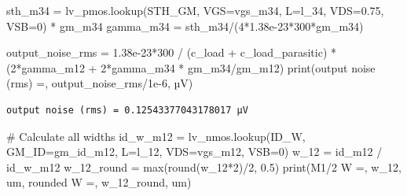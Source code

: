 \documentclass[
  a4paper,
  DIV=11,
  numbers=noendperiod]{scrartcl}
\newenvironment{Shaded}{\begin{snugshade}}{\end{snugshade}}
\newcommand{\BuiltInTok}[1]{\textcolor[rgb]{0.00,0.23,0.31}{#1}}
\newcommand{\CommentTok}[1]{\textcolor[rgb]{0.37,0.37,0.37}{#1}}
\newcommand{\DecValTok}[1]{\textcolor[rgb]{0.68,0.00,0.00}{#1}}
\newcommand{\FloatTok}[1]{\textcolor[rgb]{0.68,0.00,0.00}{#1}}
\newcommand{\NormalTok}[1]{\textcolor[rgb]{0.00,0.23,0.31}{#1}}
\newcommand{\OperatorTok}[1]{\textcolor[rgb]{0.37,0.37,0.37}{#1}}
\newcommand{\StringTok}[1]{\textcolor[rgb]{0.13,0.47,0.30}{#1}}
\begin{document}
\begin{tcolorbox}
\begin{Shaded}
\begin{Highlighting}[]
\NormalTok{sth\_m34 }\OperatorTok{=}\NormalTok{ lv\_pmos.lookup(}\StringTok{\textquotesingle{}STH\_GM\textquotesingle{}}\NormalTok{, VGS}\OperatorTok{=}\NormalTok{vgs\_m34, L}\OperatorTok{=}\NormalTok{l\_34, VDS}\OperatorTok{=}\FloatTok{0.75}\NormalTok{, VSB}\OperatorTok{=}\DecValTok{0}\NormalTok{) }\OperatorTok{*}\NormalTok{ gm\_m34}
\NormalTok{gamma\_m34 }\OperatorTok{=}\NormalTok{ sth\_m34}\OperatorTok{/}\NormalTok{(}\DecValTok{4}\OperatorTok{*}\FloatTok{1.38e{-}23}\OperatorTok{*}\DecValTok{300}\OperatorTok{*}\NormalTok{gm\_m34)}

\NormalTok{output\_noise\_rms }\OperatorTok{=} \FloatTok{1.38e{-}23}\OperatorTok{*}\DecValTok{300} \OperatorTok{/}\NormalTok{ (c\_load }\OperatorTok{+}\NormalTok{ c\_load\_parasitic) }\OperatorTok{*}\NormalTok{ (}\DecValTok{2}\OperatorTok{*}\NormalTok{gamma\_m12 }\OperatorTok{+} \DecValTok{2}\OperatorTok{*}\NormalTok{gamma\_m34 }\OperatorTok{*}\NormalTok{ gm\_m34}\OperatorTok{/}\NormalTok{gm\_m12)}
\BuiltInTok{print}\NormalTok{(}\StringTok{\textquotesingle{}output noise (rms) =\textquotesingle{}}\NormalTok{, output\_noise\_rms}\OperatorTok{/}\FloatTok{1e{-}6}\NormalTok{, }\StringTok{\textquotesingle{}µV\textquotesingle{}}\NormalTok{)}
\end{Highlighting}
\end{Shaded}

\begin{verbatim}
output noise (rms) = 0.12543377043178017 µV
\end{verbatim}

\begin{Shaded}
\begin{Highlighting}[]
\CommentTok{\# Calculate all widths}
\NormalTok{id\_w\_m12 }\OperatorTok{=}\NormalTok{ lv\_nmos.lookup(}\StringTok{\textquotesingle{}ID\_W\textquotesingle{}}\NormalTok{, GM\_ID}\OperatorTok{=}\NormalTok{gm\_id\_m12, L}\OperatorTok{=}\NormalTok{l\_12, VDS}\OperatorTok{=}\NormalTok{vgs\_m12, VSB}\OperatorTok{=}\DecValTok{0}\NormalTok{)}
\NormalTok{w\_12 }\OperatorTok{=}\NormalTok{ id\_m12 }\OperatorTok{/}\NormalTok{ id\_w\_m12}
\NormalTok{w\_12\_round }\OperatorTok{=} \BuiltInTok{max}\NormalTok{(}\BuiltInTok{round}\NormalTok{(w\_12}\OperatorTok{*}\DecValTok{2}\NormalTok{)}\OperatorTok{/}\DecValTok{2}\NormalTok{, }\FloatTok{0.5}\NormalTok{)}
\BuiltInTok{print}\NormalTok{(}\StringTok{\textquotesingle{}M1/2 W =\textquotesingle{}}\NormalTok{, w\_12, }\StringTok{\textquotesingle{}um, rounded W =\textquotesingle{}}\NormalTok{, w\_12\_round, }\StringTok{\textquotesingle{}um\textquotesingle{}}\NormalTok{)}


\end{Highlighting}
\end{Shaded}
\end{tcolorbox}
\end{document}
